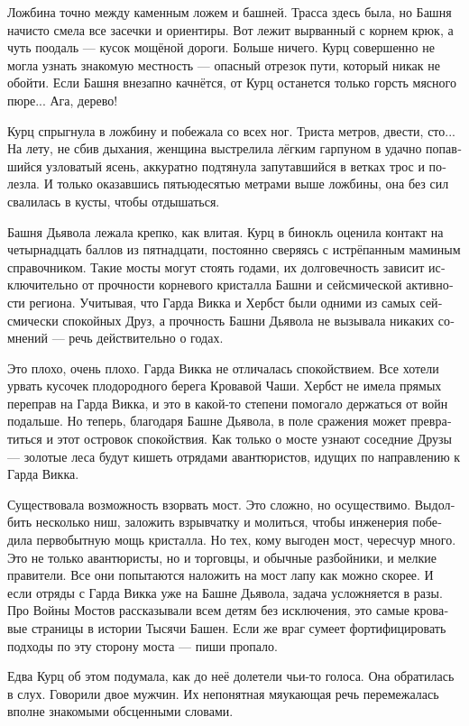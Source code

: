 \documentclass[a4paper,12pt,fleqn]{book}\usepackage{polyglossia}\setdefaultlanguage[babelshorthands=true]{russian}\setotherlanguage{english}\defaultfontfeatures{Ligatures=TeX,Mapping=tex-text}\usepackage{xcolor}\newcommand{\ml}[3]{#2}
\begin{document}
Ложбина точно между каменным ложем и башней.
Трасса здесь была, но Башня начисто смела все засечки и ориентиры.
Вот лежит вырванный с корнем крюк, а чуть поодаль --- кусок мощёной дороги.
Больше ничего.
Курц совершенно не могла узнать знакомую местность --- опасный отрезок пути, который никак не обойти.
Если Башня внезапно качнётся, от Курц останется только горсть мясного пюре...
Ага, дерево!

Курц спрыгнула в ложбину и побежала со всех ног.
Триста метров, двести, сто...
На лету, не сбив дыхания, женщина выстрелила лёгким гарпуном в удачно попавшийся узловатый ясень, аккуратно подтянула запутавшийся в ветках трос и полезла.
И только оказавшись пятьюдесятью метрами выше ложбины, она без сил свалилась в кусты, чтобы отдышаться.

Башня Дьявола лежала крепко, как влитая.
Курц в бинокль оценила контакт на четырнадцать баллов из пятнадцати, постоянно сверяясь с истрёпанным маминым справочником.
Такие мосты могут стоять годами, их долговечность зависит исключительно от прочности корневого кристалла Башни и сейсмической активности региона.
Учитывая, что Гарда Викка и Хербст были одними из самых сейсмически спокойных Друз, а прочность Башни Дьявола не вызывала никаких сомнений --- речь действительно о годах.

Это плохо, очень плохо.
Гарда Викка не отличалась спокойствием.
Все хотели урвать кусочек плодородного берега Кровавой Чаши.
Хербст не имела прямых переправ на Гарда Викка, и это в какой-то степени помогало держаться от войн подальше.
Но теперь, благодаря Башне Дьявола, в поле сражения может превратиться и этот островок спокойствия.
Как только о мосте узнают соседние Друзы --- золотые леса будут кишеть отрядами авантюристов, идущих по направлению к Гарда Викка.

Существовала возможность взорвать мост.
Это сложно, но осуществимо.
Выдолбить несколько ниш, заложить взрывчатку и молиться, чтобы инженерия победила первобытную мощь кристалла.
Но тех, кому выгоден мост, чересчур много.
Это не только авантюристы, но и торговцы, и обычные разбойники, и мелкие правители.
Все они попытаются наложить на мост лапу как можно скорее.
И если отряды с Гарда Викка уже на Башне Дьявола, задача усложняется в разы.
Про Войны Мостов рассказывали всем детям без исключения, это самые кровавые страницы в истории Тысячи Башен.
Если же враг сумеет фортифицировать подходы по эту сторону моста --- пиши пропало.

Едва Курц об этом подумала, как до неё долетели чьи-то голоса.
Она обратилась в слух.
Говорили двое мужчин.
Их непонятная мяукающая речь перемежалась вполне знакомыми обсценными словами.
\end{document}
